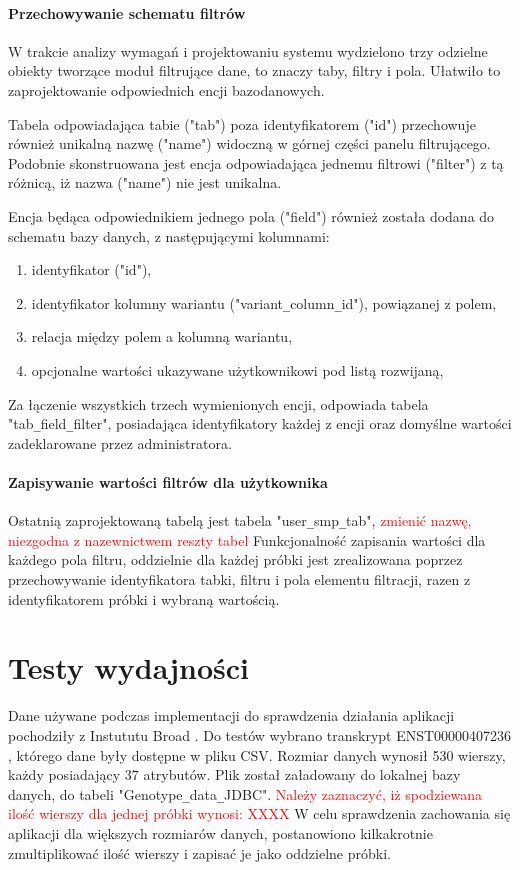 \documentclass[a4paper,12pt,twoside]{article}
\begin{document}
\newpage
\paragraph{Przechowywanie schematu filtrów} W trakcie analizy wymagań i projektowaniu systemu wydzielono trzy odzielne obiekty tworzące moduł filtrujące dane, to znaczy taby, filtry i pola.
Ułatwiło to zaprojektowanie odpowiednich encji bazodanowych.

Tabela odpowiadająca tabie ("tab") poza identyfikatorem ("id") przechowuje również unikalną nazwę ("name") widoczną w górnej części panelu filtrującego. 
Podobnie skonstruowana jest encja odpowiadająca jednemu filtrowi ("filter") z tą różnicą, 
iż nazwa ("name") nie jest unikalna. 

Encja będąca odpowiednikiem jednego pola ("field") również została dodana do schematu bazy danych,
z następującymi kolumnami: 
\begin{enumerate}[1)]
\item identyfikator ("id"),
\item identyfikator kolumny wariantu ("variant\verb!_!column\verb!_!id"), powiązanej z polem,
\item relacja między polem a kolumną wariantu,
\item opcjonalne wartości ukazywane użytkownikowi pod listą rozwijaną,
\end{enumerate}

Za łączenie wszystkich trzech wymienionych encji, odpowiada tabela 
"tab\verb!_!field\verb!_!filter", posiadająca identyfikatory każdej z encji oraz
domyślne wartości zadeklarowane przez administratora.

\paragraph{Zapisywanie wartości filtrów dla użytkownika} 
Ostatnią zaprojektowaną tabelą jest tabela "user\verb!_!smp\verb!_!tab",
\textcolor{red}{
 zmienić nazwę, niezgodna z nazewnictwem reszty tabel
}
Funkcjonalność zapisania wartości dla każdego pola filtru, oddzielnie dla każdej próbki
jest zrealizowana poprzez przechowywanie identyfikatora tabki, filtru i pola elementu filtracji,
razen z identyfikatorem próbki i wybraną wartością. 

\newpage
\section{Testy wydajności}  

Dane używane podczas implementacji do sprawdzenia działania aplikacji pochodziły
z Instututu Broad \cite{exac}.
Do testów wybrano transkrypt ENST00000407236 \cite{testData},
którego dane były dostępne w pliku CSV. Rozmiar danych wynosił 530 wierszy, każdy posiadający 37 atrybutów. Plik został załadowany do lokalnej bazy danych, do tabeli 
"Genotype\verb!_!data\verb!_!JDBC".
\textcolor{red}{Należy zaznaczyć, iż spodziewana ilość wierszy dla jednej próbki wynosi: XXXX}
 W celu sprawdzenia zachowania się aplikacji 
dla większych rozmiarów danych, postanowiono kilkakrotnie zmultiplikować
ilość wierszy i zapisać je jako oddzielne próbki.
\end{document}
